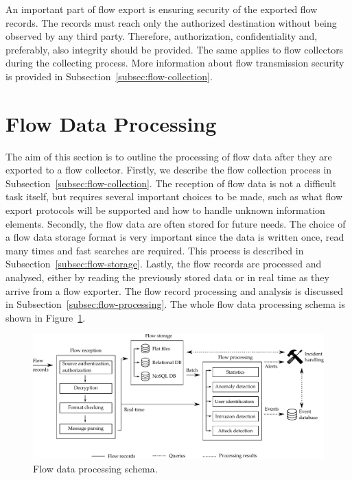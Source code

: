 An important part of flow export is ensuring security of the exported flow records. The records must reach only the authorized destination without being observed by any third party. Therefore, authorization, confidentiality and, preferably, also integrity should be provided. The same applies to flow collectors during the collecting process. More information about flow transmission security is provided in Subsection~\ref{subsec:flow-collection}.

\section{Flow Data Processing}\label{sec:flow-data-processing}

The aim of this section is to outline the processing of flow data after they are exported to a flow collector. Firstly, we describe the flow collection process in Subsection~\ref{subsec:flow-collection}. The reception of flow data is not a difficult task itself, but requires several important choices to be made, such as what flow export protocols will be supported and how to handle unknown information elements. Secondly, the flow data are often stored for future needs. The choice of a flow data storage format is very important since the data is written once, read many times and fast searches are required. This process is described in Subsection~\ref{subsec:flow-storage}. Lastly, the flow records are processed and analysed, either by reading the previously stored data or in real time as they arrive from a flow exporter. The flow record processing and analysis is discussed in Subsection~\ref{subsec:flow-processing}. The whole flow data processing schema is shown in Figure~\ref{fig:flow-processing-details}.

\begin{figure}
  \begin{center}
    \includegraphics[width=\textheight]{figures/flow-processing-details}
  \end{center}
  \caption{Flow data processing schema.}
  \label{fig:flow-processing-details}
\end{figure}

